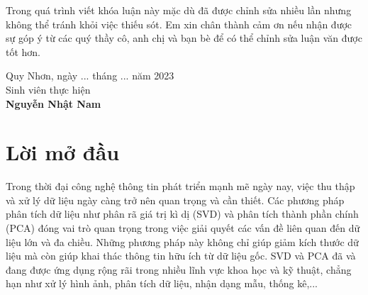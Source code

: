 \documentclass[14pt,oneside,a4paper]{report}
\numberwithin{equation}{section}
\begin{document}
	Trong quá trình viết khóa luận này mặc dù đã được chỉnh sửa nhiều lần nhưng không thể tránh khỏi việc thiếu sót. Em xin chân thành cảm ơn nếu nhận được sự góp ý từ các quý thầy cô, anh chị và bạn bè để có thể chỉnh sửa luận văn được tốt hơn.
\vskip 0.5cm
\begin{flushright}
	Quy Nhơn, ngày ... tháng ... năm 2023\qquad\\
	Sinh viên thực hiện\qquad\qquad\qquad\qquad\\
	
	\vskip 2.5cm
	\textbf{  Nguyễn Nhật Nam}\qquad\quad\quad\quad\qquad\\
\end{flushright}

\tableofcontents

\fontsize{14}{12}\selectfont


\chapter*{Lời mở đầu}


	Trong thời đại công nghệ thông tin phát triển mạnh mẽ ngày nay, việc thu thập và xử lý dữ liệu ngày càng trở nên quan trọng và cần thiết. Các phương pháp phân tích dữ liệu như phân rã giá trị kì dị (SVD) và phân tích thành phần chính (PCA) đóng vai trò quan trọng trong việc giải quyết các vấn đề liên quan đến dữ liệu lớn và đa chiều. Những phương pháp này không chỉ giúp giảm kích thước dữ liệu mà còn giúp khai thác thông tin hữu ích từ dữ liệu gốc. SVD và PCA đã và đang được ứng dụng rộng rãi trong nhiều lĩnh vực khoa học và kỹ thuật, chẳng hạn như xử lý hình ảnh, phân tích dữ liệu, nhận dạng mẫu, thống kê,...
	
\end{document}
